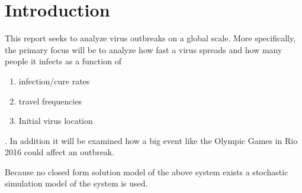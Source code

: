 \section{Introduction}
This report seeks to analyze virus outbreaks on a global scale. More specifically, the primary focus will be to analyze how fast a virus spreads and how many people it infects as a function of 
\begin{enumerate}
	\item infection/cure rates
	\item travel frequencies
	\item Initial virus location
\end{enumerate}
. In addition it will be examined how a big event like the Olympic Games in Rio 2016 could affect an outbreak.

Because no closed form solution model of the above system exists a stochastic simulation model of the system is used.